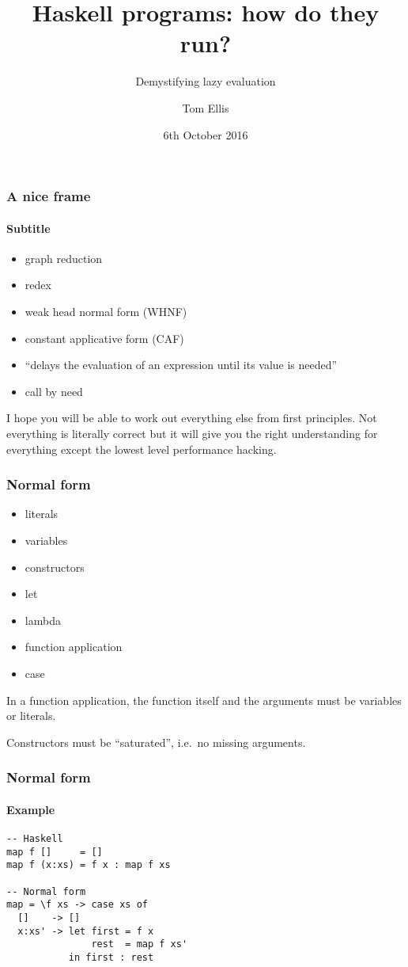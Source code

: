\documentclass{beamer}
\title{Haskell programs: how do they run?}
\subtitle{Demystifying lazy evaluation}
\author{Tom Ellis}
\date{6th October 2016}
\begin{document}
\begin{frame}[t]
\titlepage
\end{frame}

\begin{frame}
\frametitle{A nice frame}
\framesubtitle{Subtitle}

\begin{itemize}
\item graph reduction
\item redex
\item weak head normal form (WHNF)
\item constant applicative form (CAF)
\item ``delays the evaluation of an expression until its value is needed''
\item call by need
\end{itemize}

I hope you will be able to work out everything else from first
principles.  Not everything is literally correct but it will give you
the right understanding for everything except the lowest level
performance hacking.

\end{frame}

\begin{frame}
  \frametitle{Normal form}

  \begin{itemize}
  \item literals
  \item variables
  \item constructors
  \item let
  \item lambda
  \item function application
  \item case
  \end{itemize}

  In a function application, the function itself and the arguments
  must be variables or literals.

  Constructors must be ``saturated'', i.e.\ no missing arguments.
\end{frame}

\begin{frame}[fragile]
  \frametitle{Normal form}
  \framesubtitle{Example}

  \begin{verbatim}
-- Haskell
map f []     = []
map f (x:xs) = f x : map f xs

-- Normal form
map = \f xs -> case xs of
  []    -> []   
  x:xs' -> let first = f x
               rest  = map f xs'
           in first : rest
  \end{verbatim}

\end{frame}
\end{document}
